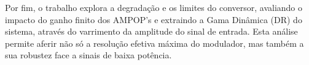 Por fim, o trabalho explora a degradação e os limites do conversor, avaliando o impacto do ganho finito
dos AMPOP's e extraindo a Gama Dinâmica (DR) do sistema, através do varrimento
da amplitude do sinal de entrada. Esta análise permite aferir não só a resolução efetiva máxima do modulador,
mas também a sua robustez face a sinais de baixa potência.